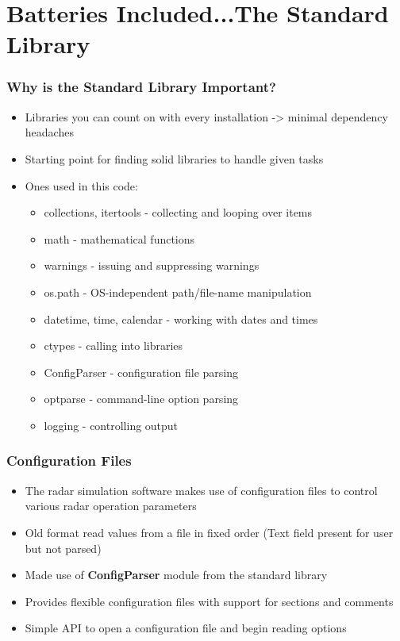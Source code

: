 \documentclass[red, hyperref={pdfpagelabels=false}]{beamer}
\begin{document}
\section[The Standard Library]{Batteries Included...The Standard Library}
\begin{frame}
  \frametitle{Why is the Standard Library Important?}
  \begin{itemize}
    \item<1-> Libraries you can count on with every installation -> minimal dependency headaches
    \item<2-> Starting point for finding solid libraries to handle given tasks
    \item<3-> Ones used in this code:
      \begin{itemize}
        \item collections, itertools - collecting and looping over items
        \item math - mathematical functions
        \item warnings - issuing and suppressing warnings
        \item os.path - OS-independent path/file-name manipulation
        \item datetime, time, calendar - working with dates and times
        \item ctypes - calling into libraries
        \item \alert<4->{ConfigParser} - configuration file parsing
        \item \alert<4->{optparse} - command-line option parsing
        \item \alert<4->{logging} - controlling output
      \end{itemize}
  \end{itemize}
\end{frame}

\begin{frame}
  \frametitle{Configuration Files}
  \begin{itemize}
    \item The radar simulation software makes use of configuration files to
      control various radar operation parameters
    \item Old format read values from a file in fixed order (Text field present for user but not parsed)
    \item Made use of \textbf{ConfigParser} module from the standard library
    \item Provides flexible configuration files with support for sections and comments
    \item Simple API to open a configuration file and begin reading options
  \end{itemize}
\end{frame}
\end{document}
